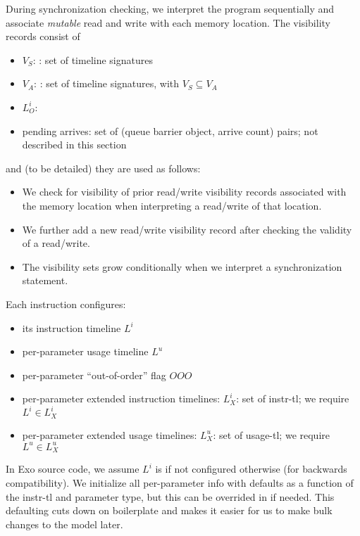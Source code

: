 During synchronization checking, we interpret the program sequentially and associate \textit{mutable} read and write  with each memory location.
The visibility records consist of
\begin{itemize}
  \item $V_S$: : set of timeline signatures
  \filbreak
  \item $V_A$: : set of timeline signatures, with $V_S \subseteq V_A$
  \filbreak
  \item $L_O^i$: 
  \filbreak
  \item pending arrives: set of (queue barrier object, arrive count) pairs; not described in this section
\end{itemize}
\filbreak
and (to be detailed) they are used as follows:
\begin{itemize}
  \item We check for visibility of prior read/write visibility records associated with the memory location when interpreting a read/write of that location.
  \filbreak
  \item We further add a new read/write visibility record after checking the validity of a read/write.
  \filbreak
  \item The visibility sets grow conditionally when we interpret a synchronization statement.
\end{itemize}

\filbreak
{}

Each instruction configures:
\begin{itemize}
  \item its instruction timeline $L^i$
  \filbreak
  \item per-parameter usage timeline $L^u$
  \filbreak
  \item per-parameter ``out-of-order'' flag $OOO$
  \filbreak
  \item per-parameter extended instruction timelines: $L_X^i$: set of instr-tl; we require $L^i \in L_X^i$
  \filbreak
  \item per-parameter extended usage timelines: $L_X^u$: set of usage-tl; we require $L^u \in L_X^u$
\end{itemize}
In Exo source code, we assume $L^i$ is  if not configured otherwise (for backwards compatibility).
We initialize all per-parameter info with defaults as a function of the instr-tl and parameter  type, but this can be overrided in  if needed.
This defaulting cuts down on boilerplate and makes it easier for us to make bulk changes to the model later.

